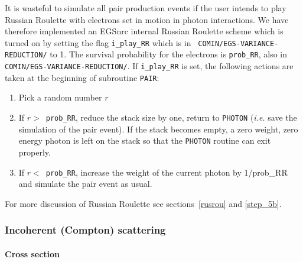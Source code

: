 It is wasteful to simulate all pair production events if 
the user intends to play Russian Roulette with electrons 
set in motion in photon interactions. We have therefore implemented 
an EGSnrc internal Russian Roulette scheme which is turned on 
by setting the flag {\tt i\_play\_RR} which is in {\tt
COMIN/EGS-VARIANCE-REDUCTION/} 
to 1. The survival probability for the electrons is 
{\tt prob\_RR}, also in {\tt COMIN/EGS-VARIANCE-REDUCTION/}. 
If {\tt i\_play\_RR} is set, the following actions are 
taken at the beginning of subroutine {\tt PAIR}:
 
\begin{enumerate}
\item
Pick a random number $r$
\item
If $r > $~{\tt prob\_RR}, reduce the stack size by one, return 
to {\tt PHOTON} ({\em i.e.} save the simulation of the pair event). 
If the stack becomes empty, a zero weight, zero energy photon 
is left on the stack so that the {\tt PHOTON} routine can exit 
properly.
\item
If $r < $~{\tt prob\_RR}, increase the weight of the current photon by 
1/prob\_RR and simulate the pair event as usual. 
\end{enumerate}
For more discussion of Russian Roulette see sections~\ref{rusrou} and
\ref{step_5b}.

\subsubsection{Incoherent (Compton) scattering}
\setcounter{equation}{0}
\label{compton}

\paragraph{Cross section}\hfill

